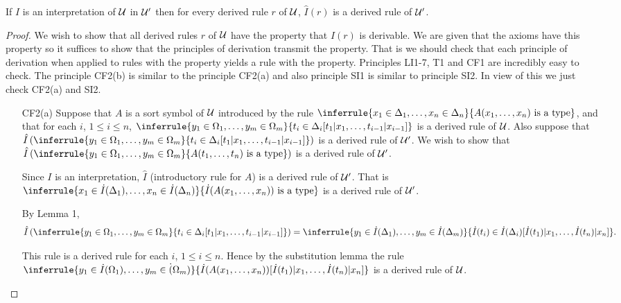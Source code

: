 \begin{lemma}[2]
 If $I$ is an interpretation of $\mathcal{U}$ in $\mathcal{U}'$ then for every derived rule $r$ of $\mathcal{U}$, $\hat I(r)$ is a derived rule of $\mathcal{U}'$.
\end{lemma}
\begin{proof}
  We wish to show that all derived rules $r$ of $\mathcal{U}$ have the property that $\hat I(r)$ is derivable.
%
 We are given that the axioms have this property so it suffices to show that the principles of derivation transmit the property.
%
 That is we should check that each principle of derivation when applied to rules with the property yields a rule with the property.
%
 Principles LI1-7, T1 and CF1 are incredibly easy to check.
%
 The principle CF2(b) is similar to the principle CF2(a) and also principle SI1 is similar to principle SI2.
%
 In view of this we just check CF2(a) and SI2.

\begin{enumerate}
  \item[CF2(a)] Suppose that $A$ is a sort symbol of $\mathcal{U}$ introduced by the rule $\inferrule{x_1\in\Delta_1,\ldots,x_n\in\Delta_n}{A(x_1,\ldots,x_n)\isatype}$, and that for each $i$, $1\leq i\leq n$, $\inferrule{y_1\in\Omega_1,\ldots,y_m\in\Omega_m}{t_i\in\Delta_i[t_1|x_1,\ldots,t_{i-1}|x_{i-1}]}$ is a derived rule of $\mathcal{U}$.
%
 Also suppose that $\hat I\left(\inferrule{y_1\in\Omega_1,\ldots,y_m\in\Omega_m}{t_i\in\Delta_i[t_1|x_1,\ldots,t_{i-1}|x_{i-1}]}\right)$ is a derived rule of $\mathcal{U}'$.
%
 We wish to show that $\hat I\left(\inferrule{y_1\in\Omega_1,\ldots,y_m\in\Omega_m}{A(t_1,\ldots,t_n)\isatype}\right)$ is a derived rule of $\mathcal{U}'$.

  Since $I$ is an interpretation, $\hat I$ (introductory rule for $A$) is a derived rule of $\mathcal{U}'$.
%
 That is $\inferrule{x_1\in\dot I(\Delta_1),\ldots,x_n\in\dot I(\Delta_n)}{\dot I(A(x_1,\ldots,x_n))\isatype}$ is a derived rule of $\mathcal{U}'$.

  By Lemma 1, 
\[\hat I\left(\inferrule{y_1\in\Omega_1,\ldots,y_m\in\Omega_m}{t_i\in\Delta_i[t_1|x_1,\ldots,t_{i-1}|x_{i-1}]}\right) = \inferrule{y_1\in\dot I(\Delta_1),\ldots,y_m\in\dot I(\Delta_m)}{\dot I(t_i)\in\dot I(\Delta_i)[\dot I(t_1)|x_1,\ldots,\dot I(t_n)|x_n]}.\]

  This rule is a derived rule for each $i$, $1\leq i\leq n$.
%
 Hence by the substitution lemma the rule $\inferrule{y_1\in\dot I(\Omega_1),\ldots,y_m\in\dot (\Omega_m)}{\dot I(A(x_1,\ldots,x_n))[\dot I(t_1)|x_1,\ldots,\dot I(t_n)|x_n]}$ is a derived rule of $\mathcal{U}$.


\end{enumerate}
\end{proof}

